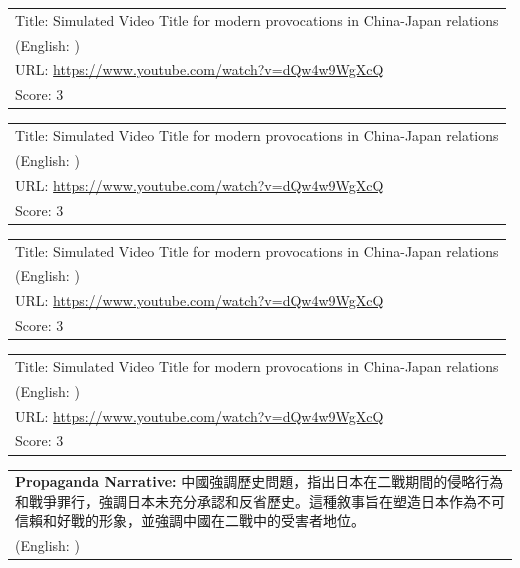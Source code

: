 \documentclass{article}
\begin{document}
\noindent
\begin{tabular}{p{}}
Title: Simulated Video Title for modern provocations in China-Japan relations \\
(English: ) \\
URL: \url{https://www.youtube.com/watch?v=dQw4w9WgXcQ} \\
Score: 3 \\
\end{tabular}
\vspace{0.5em}

\noindent
\begin{tabular}{p{}}
Title: Simulated Video Title for modern provocations in China-Japan relations \\
(English: ) \\
URL: \url{https://www.youtube.com/watch?v=dQw4w9WgXcQ} \\
Score: 3 \\
\end{tabular}
\vspace{0.5em}

\noindent
\begin{tabular}{p{}}
Title: Simulated Video Title for modern provocations in China-Japan relations \\
(English: ) \\
URL: \url{https://www.youtube.com/watch?v=dQw4w9WgXcQ} \\
Score: 3 \\
\end{tabular}
\vspace{0.5em}

\noindent
\begin{tabular}{p{}}
Title: Simulated Video Title for modern provocations in China-Japan relations \\
(English: ) \\
URL: \url{https://www.youtube.com/watch?v=dQw4w9WgXcQ} \\
Score: 3 \\
\end{tabular}
\vspace{0.5em}

\vspace{1em}
\noindent
\begin{tabular}{p{}}
\textbf{Propaganda Narrative:} 中國強調歷史問題，指出日本在二戰期間的侵略行為和戰爭罪行，強調日本未充分承認和反省歷史。這種敘事旨在塑造日本作為不可信賴和好戰的形象，並強調中國在二戰中的受害者地位。 \\
(English: ) \\
\end{tabular}
\end{document}
